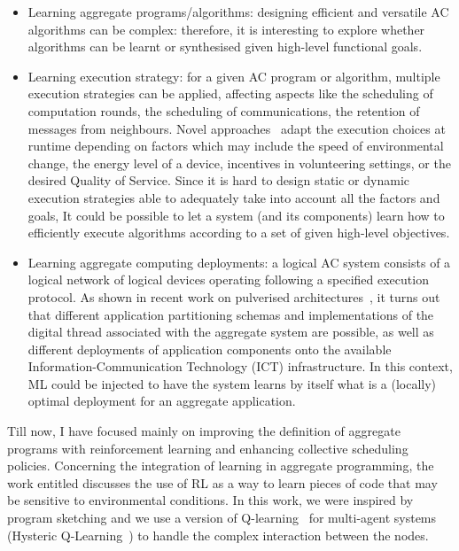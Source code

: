 \documentclass[11pt]{article}
\begin{document}
\begin{itemize}
	\item Learning aggregate programs/algorithms: designing efficient and versatile AC algorithms can be complex: 
	therefore, it is interesting to explore
	whether algorithms can be learnt or synthesised given high-level functional goals.
	
	\item Learning execution strategy: for a given AC program or algorithm, 
	 multiple execution strategies can be applied, 
	 affecting aspects like the scheduling
	 of computation rounds, 
	 the scheduling of communications, 
	 the retention of messages from neighbours. 
	Novel approaches~\cite{zambonelli2021time} 
	 adapt the execution choices at runtime 
	 depending on factors which may include the speed of environmental change, 
	 the energy level of a device, incentives in volunteering settings, 
	 or the desired Quality of Service.
	Since it is hard to design static
	 or dynamic execution strategies able 
	 to adequately take into account all the factors and goals, 
	 It could be possible to let a system (and its components) 
	 learn how to efficiently execute algorithms according 
	 to a set of given high-level objectives.
	
	\item Learning aggregate computing deployments: a logical AC system consists of a logical network of
	 logical devices operating following a specified execution protocol. 
	As shown in recent work on pulverised architectures~\cite{Casadei2020}, 
	 it turns out that different application partitioning schemas and implementations of the digital thread associated 
	 with the aggregate system are possible, 
	 as well as different deployments of application components onto the available Information-Communication Technology (ICT) infrastructure. 
	In this context, ML could be injected to have 
	 the system learns by itself what is a (locally) optimal deployment 
	 for an aggregate application.
\end{itemize}
Till now, I have focused mainly on improving 
 the definition of aggregate programs with reinforcement learning 
 and enhancing collective scheduling policies.
%
Concerning the integration of learning in aggregate programming, the work 
 entitled \textit{} 
 discusses the use of RL as a way to learn pieces of code 
 that may be sensitive to environmental conditions. 
 In this work, we were inspired by program sketching 
 and we use a version of Q-learning~\cite{watkins1992q} for multi-agent systems (Hysteric Q-Learning~\cite{matignon2007hysteretic})
 to handle the complex interaction between the nodes. 
 
\end{document}
